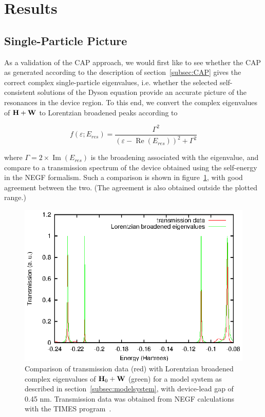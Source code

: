 \section{Results}
\label{sec:results}

\subsection{Single-Particle Picture}
\label{subsec:SingleParticle}

As a validation of the CAP approach, we would first like to see whether the
CAP as generated according to the description of section~\ref{subsec:CAP} gives
the correct complex single-particle eigenvalues, i.e. whether the selected
self-consistent solutions of the Dyson equation provide an accurate picture of
the resonances in the device region. To this end, we convert the complex
eigenvalues of $\mathbf{H} + \mathbf{W}$ to Lorentzian broadened peaks according to

\begin{equation}
	f(\varepsilon;E_{res})
	= \frac{\Gamma^2}{(\varepsilon - \operatorname{Re}(E_{res}))^2 + \Gamma^2}
	\label{eq:lobro}
\end{equation}

where $\Gamma = 2 \times \operatorname{Im}(E_{res})$ is the broadening
associated with the eigenvalue, and compare to a transmission spectrum of the
device obtained using the self-energy in the NEGF formalism. Such a comparison
is shown in figure~\ref{fig:lobro-hwevals}, with good agreement between the
two. (The agreement is also obtained outside the plotted range.)

\begin{figure}
	\begin{center}
		\includegraphics[width=0.9\linewidth]{figures/4evals}
	\end{center}
	\caption{Comparison of transmission data (red) with Lorentzian
	broadened complex eigenvalues of $\mathbf{H}_0 + \mathbf{W}$ (green) for a
	model system as described in section~\ref{subsec:modelsystem}, with
	device-lead gap of 0.45 nm. Transmission data was obtained from NEGF
	calculations with the TIMES program~\cite{times}.}
	\label{fig:lobro-hwevals}
\end{figure}

